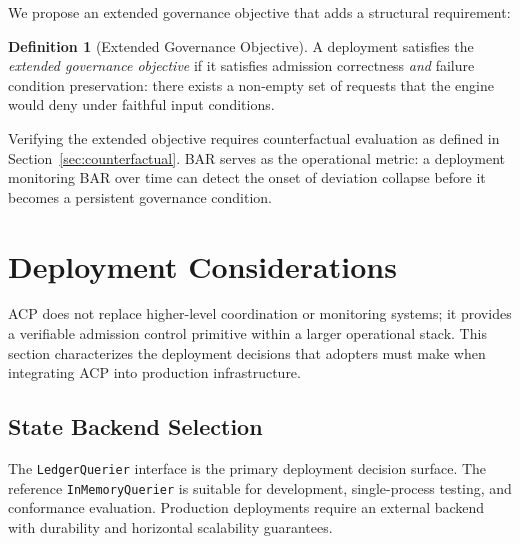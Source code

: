 \documentclass[11pt]{article}
\theoremstyle{definition}
\newtheorem{definition}{Definition}
\begin{document}
We propose an extended governance objective that adds a structural requirement:

\begin{definition}[Extended Governance Objective]
A deployment satisfies the \emph{extended governance objective} if it satisfies
admission correctness \emph{and} failure condition preservation: there exists a
non-empty set of requests that the engine would deny under faithful input conditions.
\end{definition}

Verifying the extended objective requires counterfactual evaluation as defined in
Section~\ref{sec:counterfactual}.
BAR serves as the operational metric: a deployment monitoring BAR over time
can detect the onset of deviation collapse before it becomes a persistent
governance condition.

\section{Deployment Considerations}
\label{sec:deployment}

ACP does not replace higher-level coordination or monitoring systems;
it provides a verifiable admission control primitive within a larger operational stack.
This section characterizes the deployment decisions that adopters must make
when integrating ACP into production infrastructure.

\subsection{State Backend Selection}

The \texttt{LedgerQuerier} interface is the primary deployment decision surface.
The reference \texttt{InMemoryQuerier} is suitable for development, single-process
testing, and conformance evaluation.
Production deployments require an external backend with durability and horizontal
scalability guarantees.
\end{document}
